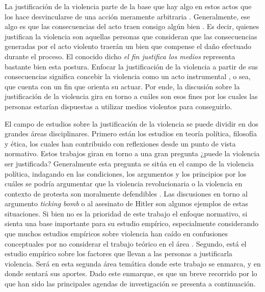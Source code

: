 \documentclass[12pt,twoside]{templates/facsothesis}
\begin{document}
La justificación de la violencia parte de la base que hay algo en estos actos que los hace desvincularse de una acción meramente arbitraria \citep{Basaure2020}. Generalmente, ese algo es que las consecuencias del acto traen consigo algún bien \citep{Frazer2019}. Es decir, quienes justifican la violencia son aquellas personas que consideran que las consecuencias generadas por el acto violento traerán un bien que compense el daño efectuado durante el proceso. El conocido dicho \emph{el fin justifica los medios} representa bastante bien esta postura. Enfocar la justificación de la violencia a partir de sus consecuencias significa concebir la violencia como un acto instrumental \citep{Blumenthal1972, Arendt2005}, o sea, que cuenta con un fin que orienta su actuar. Por ende, la discusión sobre la justificación de la violencia gira en torno a cuáles son esos fines por los cuales las personas estarían dispuestas a utilizar medios violentos para conseguirlo.

El campo de estudios sobre la justificación de la violencia se puede dividir en dos grandes áreas disciplinares. Primero están los estudios en teoría política, filosofía y ética, los cuales han contribuido con reflexiones desde un punto de vista normativo. Estos trabajos giran en torno a una gran pregunta ¿puede la violencia ser justificada? Generalmente esta pregunta se sitúa en el campo de la violencia política, indagando en las condiciones, los argumentos y los principios por los cuáles se podría argumentar que la violencia revolucionaria o la violencia en contexto de protesta son moralmente defendibles \citep{Demirbas2019, Frazer2019, Gerd1969, Hills2011, Keane2004, Magil2008, Nielsen1981, Wells1970}. Las discusiones en torno al argumento \emph{ticking bomb} \citep[ver][]{APT2007, Bufacchi2006} o al asesinato de Hitler \citep[ver][]{Dean2005, Frazer2019} son algunos ejemplos de estas situaciones. Si bien no es la prioridad de este trabajo el enfoque normativo, si sienta una base importante para su estudio empírico, especialmente considerando que muchos estudios empíricos sobre violencia han caído en confusiones conceptuales por no considerar el trabajo teórico en el área \citep{Bufacchi2007}. Segundo, está el estudio empírico sobre los factores que llevan a las personas a justificarla violencia. Será en esta segunda área temática donde este trabajo se enmarca, y en donde sentará sus aportes. Dado este enmarque, es que un breve recorrido por lo que han sido las principales agendas de investigación se presenta a continuación.
\end{document}
